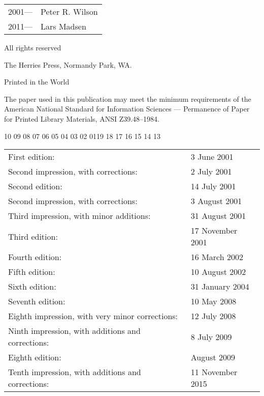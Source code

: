 \documentclass[10pt,letterpaper,extrafontsizes]{memoir}
\newcommand{\PWnote}[2]{}
\newif\ifMASTER
\begin{document}
\PWnote{2009/06/26}{Updated the copyright page for 9th impression}
\begingroup
\footnotesize
\setlength{\parindent}{0pt}
\setlength{\parskip}{\baselineskip}

\begin{tabular}{@{} l l}
  \textcopyright{} 2001\:---\:2010 &Peter R. Wilson \\
 \textcopyright{} 2011\:---\:& Lars Madsen 
\end{tabular}


All rights reserved

The Herries Press, Normandy Park, WA.

Printed in the World 

The paper used in this publication may meet the minimum requirements
of the American National Standard for Information 
Sciences --- Permanence of Paper for Printed Library Materials, 
ANSI Z39.48--1984.

\PWnote{2009/07/08}{Changed manual date to 8 July 2009}
\begin{center}
10 09 08 07 06 05 04 03 02 01\hspace{2em}19 18 17 16 15 14 13
\end{center}
\begin{center}
\begin{tabular}{ll}
First edition:                        & 3 June 2001 \\
Second impression, with corrections:    & 2 July 2001 \\
Second edition:                       & 14 July 2001 \\
Second impression, with corrections:    & 3 August 2001 \\
Third impression, with minor additions: & 31 August 2001 \\
Third edition:                        & 17 November 2001 \\
Fourth edition:                       & 16 March 2002 \\
Fifth edition:                        & 10 August 2002 \\
Sixth edition:                        & 31 January 2004 \\
Seventh edition:                       & 10 May 2008 \\
Eighth impression, with very minor corrections: & 12 July 2008 \\
Ninth impression, with additions and corrections: & 8 July 2009 \\
Eighth edition:                        & August 2009 \\
Tenth impression, with additions and corrections: & 11 November 2015 \\
\end{tabular}
\end{center}
\ifMASTER
Manual last changed \svnyear/\svnmonth/\svnday
\fi
\end{document}
